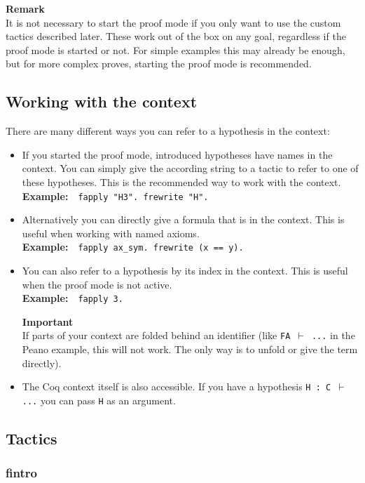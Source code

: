 \documentclass[12pt, a4paper]{article}
\newcommand{\coq}[1]{\texttt{#1}}
\newcommand{\important}[1]{
	\vspace{3pt}
	\begin{boximportant}
		\textcolor{colorimportant}{\textbf{Important}\\#1}
	\end{boximportant}}
\newcommand{\remark}[1]{
	\vspace{3pt}
	\begin{boxremark}
		\textbf{Remark}\\#1
	\end{boxremark}}
\newcommand{\example}[1]{\medskip\\\textbf{Example:}~~#1}
\begin{document}
\remark{It is not necessary to start the proof mode if you only want to use the custom tactics described later. These work out of the box on any goal, regardless if the proof mode is started or not. For simple examples this may already be enough, but for more complex proves, starting the proof mode is recommended.}


\subsection{Working with the context}

There are many different ways you can refer to a hypothesis in the context:
\begin{itemize}
	\item 
	If you started the proof mode, introduced hypotheses have names in the context. 
	You can simply give the according string to a tactic to refer to one of these hypotheses. 
	This is the recommended way to work with the context.
	\example{\coq{fapply "H3". frewrite "H".}}
	
	\item 
	Alternatively you can directly give a formula that is in the context. 
	This is useful when working with named axioms.
	\example{\coq{fapply ax_sym. frewrite (x == y).}}
	
	\item 
	You can also refer to a hypothesis by its index in the context. 
	This is useful when the proof mode is not active.
	\example{\coq{fapply 3.}}
	\important{If parts of your context are folded behind an identifier (like \texttt{FA $\vdash$ ...} in the Peano example, this will not work. The only way is to unfold or give the term directly).}
	
	\item 
	The Coq context itself is also accessible. 
	If you have a hypothesis \texttt{H : C $\vdash$ ...} you can pass \texttt{H} as an argument.
\end{itemize}




\subsection{Tactics}

\subsubsection{\ttfamily fintro}
\end{document}
